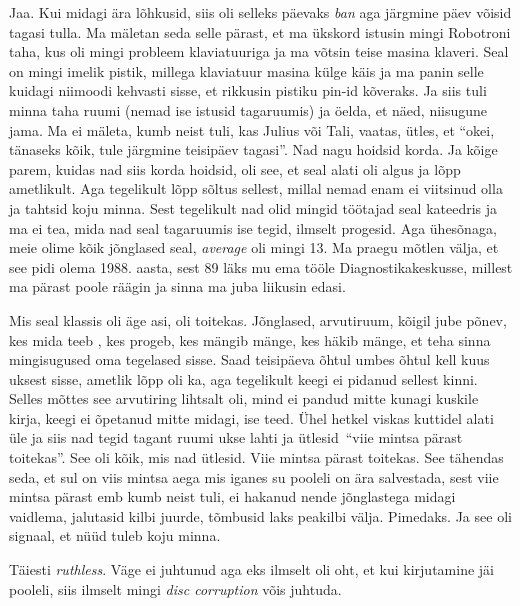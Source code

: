 Jaa. Kui midagi ära lõhkusid, siis oli selleks päevaks \emph{ban} aga järgmine päev võisid tagasi tulla. Ma mäletan seda selle pärast, et ma ükskord istusin mingi Robotroni taha, kus oli mingi probleem klaviatuuriga ja ma võtsin teise masina klaveri. Seal on mingi imelik pistik, millega klaviatuur masina külge käis ja ma panin selle kuidagi niimoodi kehvasti sisse, et rikkusin pistiku pin-id  kõveraks. Ja siis tuli minna taha ruumi (nemad ise istusid tagaruumis) ja  öelda, et näed,  niisugune jama. Ma ei mäleta, kumb neist tuli, kas Julius või Tali, vaatas, ütles, et \enquote{okei, tänaseks kõik,  tule järgmine teisipäev tagasi}. Nad nagu hoidsid korda. Ja kõige parem, kuidas nad siis korda hoidsid, oli see, et seal alati oli algus ja lõpp  ametlikult. Aga tegelikult lõpp sõltus sellest, millal nemad enam ei viitsinud olla ja tahtsid koju minna. Sest tegelikult nad olid mingid töötajad seal kateedris ja ma ei tea, mida nad seal tagaruumis ise tegid, ilmselt progesid. Aga ühesõnaga, meie olime kõik jõnglased seal, \emph{average} oli mingi 13. Ma praegu mõtlen välja, et see pidi olema 1988.  aasta, sest 89 läks mu ema tööle Diagnostikakeskusse, millest ma pärast poole räägin ja sinna ma juba liikusin edasi. 

Mis seal klassis oli äge asi, oli toitekas. Jõnglased, arvutiruum, kõigil jube põnev, kes mida teeb , kes progeb, kes mängib mänge, kes häkib mänge, et teha sinna mingisugused oma tegelased sisse. Saad teisipäeva õhtul umbes õhtul kell kuus uksest sisse,  ametlik lõpp oli ka, aga tegelikult keegi ei pidanud sellest kinni. Selles mõttes see arvutiring lihtsalt oli, mind ei pandud mitte kunagi kuskile kirja, keegi ei õpetanud mitte midagi, ise teed. Ühel hetkel viskas kuttidel alati üle ja siis nad tegid tagant ruumi ukse lahti ja ütlesid \enquote{viie mintsa pärast toitekas}. See oli kõik, mis nad ütlesid. Viie mintsa pärast toitekas. See tähendas seda, et sul on viis mintsa aega mis iganes su pooleli on ära salvestada, sest viie mintsa pärast emb kumb neist  tuli,  ei hakanud nende jõnglastega midagi vaidlema, jalutasid kilbi juurde, tõmbusid laks peakilbi välja. Pimedaks. Ja see oli signaal, et nüüd tuleb koju minna. 


Täiesti \emph{ruthless}. Väge ei juhtunud aga eks ilmselt oli oht, et kui kirjutamine jäi pooleli, siis ilmselt mingi \emph{disc corruption} võis juhtuda. 

